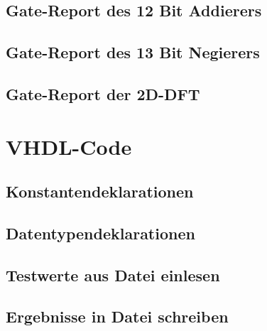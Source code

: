  \section{Gate-Report des 12 Bit Addierers}
 
 \section{Gate-Report des 13 Bit Negierers}
 
 \section{Gate-Report der 2D-DFT}
 
 
 \chapter{VHDL-Code}
 \section{Konstantendeklarationen}
 
 \section{Datentypendeklarationen}
 
 \section{Testwerte aus Datei einlesen}
 
 
 \section{Ergebnisse in Datei schreiben}
 
 
